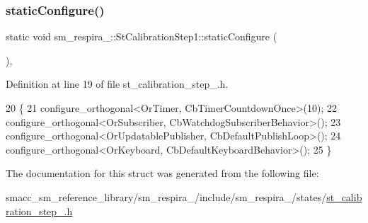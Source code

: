 \subsubsection{\texorpdfstring{static\+Configure()}{staticConfigure()}}
{\footnotesize\ttfamily static void sm\+\_\+respira\+\_\+::\+St\+Calibration\+Step1\+::static\+Configure (\begin{DoxyParamCaption}{ }\end{DoxyParamCaption})\hspace{0.3cm}{\ttfamily [inline]}, {\ttfamily [static]}}



Definition at line 19 of file st\+\_\+calibration\+\_\+step\+\_.\+h.


\begin{DoxyCode}
20     \{
21         configure\_orthogonal<OrTimer, CbTimerCountdownOnce>(10);
22         configure\_orthogonal<OrSubscriber, CbWatchdogSubscriberBehavior>();
23         configure\_orthogonal<OrUpdatablePublisher, CbDefaultPublishLoop>();
24         configure\_orthogonal<OrKeyboard, CbDefaultKeyboardBehavior>();
25     \}
\end{DoxyCode}


The documentation for this struct was generated from the following file\+:\begin{DoxyCompactItemize}
\item 
smacc\+\_\+sm\+\_\+reference\+\_\+library/sm\+\_\+respira\+\_/include/sm\+\_\+respira\+\_/states/\hyperlink{st__calibration__step__1_8h}{st\+\_\+calibration\+\_\+step\+\_.\+h}\end{DoxyCompactItemize}
